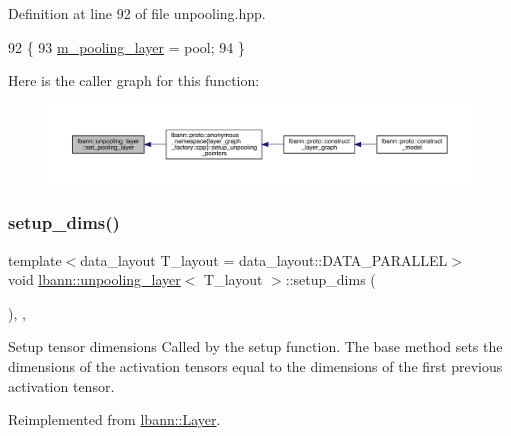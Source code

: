 Definition at line 92 of file unpooling.\+hpp.


\begin{DoxyCode}
92                                                         \{
93     \hyperlink{classlbann_1_1unpooling__layer_ab15a8b0680685f80c7d995e617e97a9a}{m\_pooling\_layer} = pool;
94   \}
\end{DoxyCode}
Here is the caller graph for this function\+:\nopagebreak
\begin{figure}[H]
\begin{center}
\leavevmode
\includegraphics[width=350pt]{classlbann_1_1unpooling__layer_a5269d1939056430c0d8033629a770b38_icgraph}
\end{center}
\end{figure}
\mbox{\label{classlbann_1_1unpooling__layer_a7fe47a0c90958329efb79aee49d6247f}} 
\subsubsection{\texorpdfstring{setup\+\_\+dims()}{setup\_dims()}}
{\footnotesize\ttfamily template$<$data\+\_\+layout T\+\_\+layout = data\+\_\+layout\+::\+D\+A\+T\+A\+\_\+\+P\+A\+R\+A\+L\+L\+EL$>$ \\
void \hyperlink{classlbann_1_1unpooling__layer}{lbann\+::unpooling\+\_\+layer}$<$ T\+\_\+layout $>$\+::setup\+\_\+dims (\begin{DoxyParamCaption}{ }\end{DoxyParamCaption})\hspace{0.3cm}{\ttfamily [inline]}, {\ttfamily [override]}, {\ttfamily [virtual]}}

Setup tensor dimensions Called by the setup function. The base method sets the dimensions of the activation tensors equal to the dimensions of the first previous activation tensor. 

Reimplemented from \hyperlink{classlbann_1_1Layer_a90fce1b06c1f2abb480e18cfe08a9746}{lbann\+::\+Layer}.



